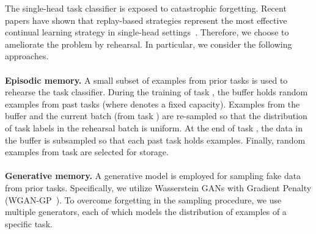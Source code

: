 \documentclass[10pt,twocolumn,letterpaper]{article}
\begin{document}
The single-head task classifier is exposed to catastrophic forgetting. Recent papers have shown that replay-based strategies represent the most effective continual learning strategy in single-head settings~\cite{threescenarios}. Therefore, we choose to ameliorate the problem by rehearsal. In particular, we consider the following approaches.
\\
\\
\textbf{Episodic memory.} A small subset of examples from prior tasks is used to rehearse the task classifier. During the training of task , the buffer holds  random examples from past tasks  (where  denotes a fixed capacity). Examples from the buffer and the current batch (from task ) are re-sampled so that the distribution of task labels in the rehearsal batch is uniform. At the end of task , the data in the buffer is subsampled so that each past task holds  examples. Finally,  random examples from task  are selected for storage.
\\
\\
\textbf{Generative memory.} A generative model is employed for sampling fake data from prior tasks. Specifically, we utilize Wasserstein GANs with Gradient Penalty (WGAN-GP~\cite{wgangp}). To overcome forgetting in the sampling procedure, we use multiple generators, each of which models the distribution of examples of a specific task.
\\
\\
\end{document}
